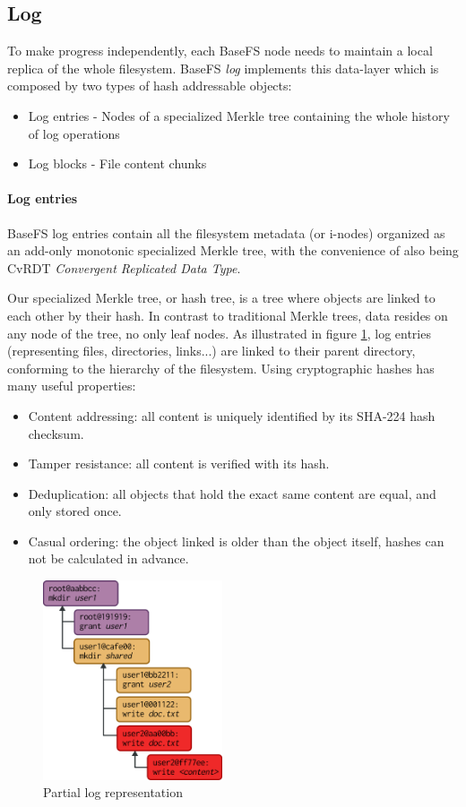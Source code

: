 \documentclass{sig-alternate}
\begin{document}
\subsection{Log}  \label{log}

To make progress independently, each BaseFS node needs to maintain a local replica of the whole filesystem. BaseFS \textit{log} implements this data-layer which is composed by two types of hash addressable objects:

\begin{itemize}
    \item Log entries - Nodes of a specialized Merkle tree containing the whole history of log operations
    \item Log blocks - File content chunks
\end{itemize}


\paragraph{Log entries}
BaseFS log entries contain all the filesystem metadata (or i-nodes) organized as an add-only monotonic specialized Merkle tree, with the convenience of also being CvRDT \textit{Convergent Replicated Data Type}\cite{shapiro2011comprehensive}.

Our specialized Merkle tree, or hash tree, is a tree where objects are linked to each other by their hash. In contrast to traditional Merkle trees, data resides on any node of the tree, no only leaf nodes. As illustrated in figure \ref{fig:log}, log entries (representing files, directories, links...) are linked to their parent directory, conforming to the hierarchy of the filesystem. Using cryptographic hashes has many useful properties:

\begin{itemize}
\item Content addressing: all content is uniquely identified by its SHA-224 hash checksum.
\item Tamper resistance: all content is verified with its hash.
\item Deduplication: all objects that hold the exact same content are equal, and only stored once.
\item Casual ordering: the object linked is older than the object itself, hashes can not be calculated in advance.
\end{itemize}


\begin{figure}
\centering
\includegraphics[width=150pt]{imgs/log.png}
\caption{Partial log representation}
\label{fig:log}
\end{figure}
\end{document}
